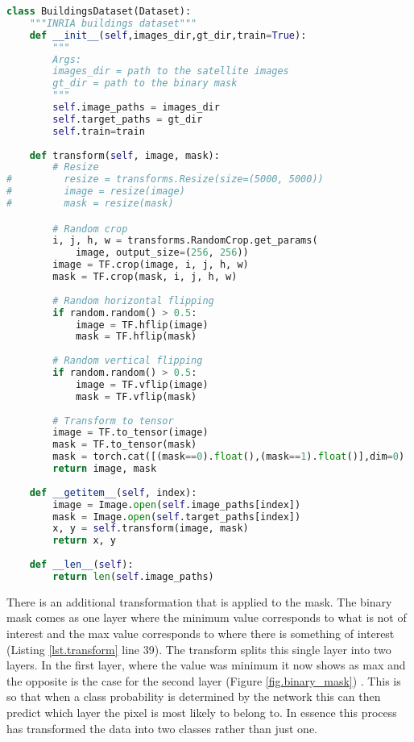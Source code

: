  \begin{lstlisting}[language=Python, caption = {Transform Class for buidling the dataset class, which can be input into the dataloader class, which in turn is iterated over in the CNN.}, label={lst.transform},float,floatplacement=htbp]
class BuildingsDataset(Dataset):
    """INRIA buildings dataset"""
    def __init__(self,images_dir,gt_dir,train=True):
        """
        Args:
        images_dir = path to the satellite images
        gt_dir = path to the binary mask
        """
        self.image_paths = images_dir
        self.target_paths = gt_dir
        self.train=train
        
    def transform(self, image, mask):
        # Resize
#         resize = transforms.Resize(size=(5000, 5000))
#         image = resize(image)
#         mask = resize(mask)

        # Random crop
        i, j, h, w = transforms.RandomCrop.get_params(
            image, output_size=(256, 256))
        image = TF.crop(image, i, j, h, w)
        mask = TF.crop(mask, i, j, h, w)
        
        # Random horizontal flipping
        if random.random() > 0.5:
            image = TF.hflip(image)
            mask = TF.hflip(mask)
            
        # Random vertical flipping
        if random.random() > 0.5:
            image = TF.vflip(image)
            mask = TF.vflip(mask)
            
        # Transform to tensor
        image = TF.to_tensor(image)
        mask = TF.to_tensor(mask)
        mask = torch.cat([(mask==0).float(),(mask==1).float()],dim=0)
        return image, mask
        
    def __getitem__(self, index):
        image = Image.open(self.image_paths[index])
        mask = Image.open(self.target_paths[index])
        x, y = self.transform(image, mask)
        return x, y
        
    def __len__(self):
        return len(self.image_paths)
\end{lstlisting}
There is an additional transformation that is applied to the mask. The binary mask comes as one layer where the minimum value corresponds to what is not of interest and the max value corresponds to where there is something of interest (Listing \ref{lst.transform} line 39). The transform splits this single layer into two layers. In the first layer, where the value was minimum it now shows as max and the opposite is the case for the second layer (Figure \ref{fig.binary_mask}) . This is so that when a class probability is determined by the network this can then predict which layer the pixel is most likely to belong to. In essence this process has transformed the data into two classes rather than just one.

